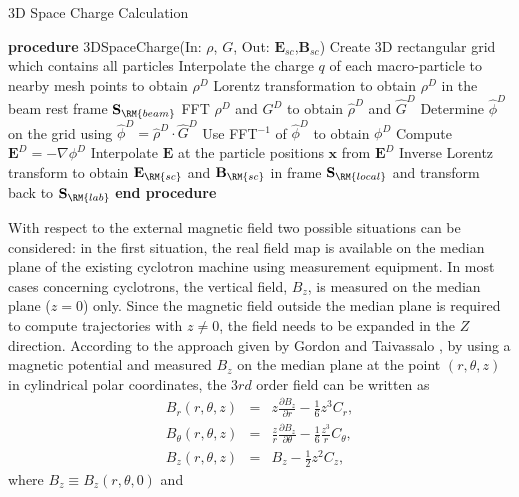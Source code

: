 \documentclass[aps,prstab,onecolumn,superscriptaddress,showpacs]{revtex4}
\newcommand{\bs}[1]{\mathbf #1}
\begin{document}
\begin{algorithm}
  \caption{3D Space Charge Calculation} 
  \label{alg1:sc3d}
  \begin{algorithmic}[1]
    \STATE \textbf{procedure} 3DSpaceCharge(In: $\rho$, $G$, Out: $\bs{E_{sc}}$,$\bs{B_{sc}}$)
       \STATE Create 3D rectangular grid which contains all particles %
       \STATE Interpolate the charge $q$ of each macro-particle to nearby mesh points to obtain $\rho^D$
       \STATE Lorentz transformation to obtain $\rho^D$ in the beam rest frame $\bs{S}_{\RM{beam}}$
       \STATE FFT $\rho^D$ and $G^D$ to obtain $\widehat{\rho}^D$ and $\widehat{G}^D$
       \STATE Determine $\widehat{\phi}^D$ on the grid using $\widehat{\phi}^D = \widehat{\rho}^D \cdot \widehat{G}^D$
       \STATE Use FFT$^{-1}$ of $\widehat{\phi }^D$ to obtain $\phi^D$
       \STATE Compute $\bs{E}^D= -\nabla \phi^D$
       \STATE Interpolate $\bs{E}$ at the particle positions $\bs{x}$ from $\bs{E}^D$
       \STATE Inverse Lorentz transform to obtain $\bs{E_{\RM{sc}}}$ and $\bs{B_{\RM{sc}}}$ in  frame $\bs{S}_{\RM{local}}$ and transform back  to $\bs{S}_{\RM{lab}}$
       \STATE \textbf{end procedure}
  \end{algorithmic}
\end{algorithm}
With respect to the external magnetic field two possible situations can be considered: 
in the first situation, the real field map is available on the median plane of the existing cyclotron machine using measurement equipment.
In most cases concerning cyclotrons, the vertical field, $B_z$, is measured on the median plane ($z=0$) only.
Since the magnetic field outside the median plane is required to compute trajectories with $z \neq 0$, the field needs to be expanded in the $Z$ direction. 
According to the approach given by Gordon and Taivassalo \cite{Gordon:2}, by using a magnetic potential and measured $B_z$ on the median plane
at the point $(r,\theta, z)$ in cylindrical polar coordinates, the 3$rd$ order field can be written as    
\begin{eqnarray}\label{eq:Bfield}
  B_r(r,\theta, z) & = & z\frac{\partial B_z}{\partial r}-\frac{1}{6}z^3 C_r, \nonumber\\    
  B_\theta(r,\theta, z) & = & \frac{z}{r}\frac{\partial B_z}{\partial \theta}-\frac{1}{6}\frac{z^3}{r} C_{\theta}, \\     
  B_z(r,\theta, z) & = & B_z-\frac{1}{2}z^2 C_z,  \nonumber    
\end{eqnarray}
where $B_z\equiv B_z(r, \theta, 0)$ and  
\end{document}
